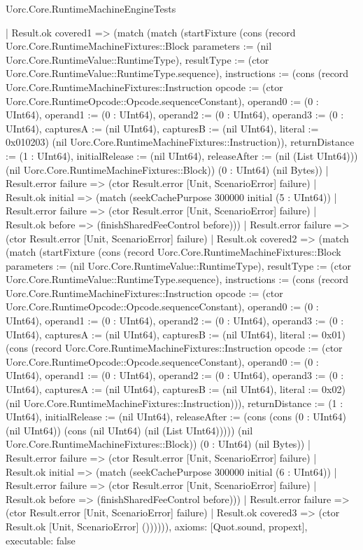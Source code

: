 \begin{lexlean}{Uorc.Core.RuntimeMachineEngineTests}
\begin{semanticmodule}
{      | Result.ok covered1 => (match (match (startFixture (cons (record Uorc.Core.RuntimeMachineFixtures::Block {parameters := (nil Uorc.Core.RuntimeValue::RuntimeType), resultType := (ctor Uorc.Core.RuntimeValue::RuntimeType.sequence), instructions := (cons (record Uorc.Core.RuntimeMachineFixtures::Instruction {opcode := (ctor Uorc.Core.RuntimeOpcode::Opcode.sequenceConstant), operand0 := (0 : UInt64), operand1 := (0 : UInt64), operand2 := (0 : UInt64), operand3 := (0 : UInt64), capturesA := (nil UInt64), capturesB := (nil UInt64), literal := 0x010203}) (nil Uorc.Core.RuntimeMachineFixtures::Instruction)), returnDistance := (1 : UInt64), initialRelease := (nil UInt64), releaseAfter := (nil (List UInt64))}) (nil Uorc.Core.RuntimeMachineFixtures::Block)) (0 : UInt64) (nil Bytes))
          | Result.error failure => (ctor Result.error [Unit, ScenarioError] failure)
          | Result.ok initial => (match (seekCachePurpose 300000 initial (5 : UInt64))
            | Result.error failure => (ctor Result.error [Unit, ScenarioError] failure)
            | Result.ok before => (finishSharedFeeControl before)))
        | Result.error failure => (ctor Result.error [Unit, ScenarioError] failure)
        | Result.ok covered2 => (match (match (startFixture (cons (record Uorc.Core.RuntimeMachineFixtures::Block {parameters := (nil Uorc.Core.RuntimeValue::RuntimeType), resultType := (ctor Uorc.Core.RuntimeValue::RuntimeType.sequence), instructions := (cons (record Uorc.Core.RuntimeMachineFixtures::Instruction {opcode := (ctor Uorc.Core.RuntimeOpcode::Opcode.sequenceConstant), operand0 := (0 : UInt64), operand1 := (0 : UInt64), operand2 := (0 : UInt64), operand3 := (0 : UInt64), capturesA := (nil UInt64), capturesB := (nil UInt64), literal := 0x01}) (cons (record Uorc.Core.RuntimeMachineFixtures::Instruction {opcode := (ctor Uorc.Core.RuntimeOpcode::Opcode.sequenceConstant), operand0 := (0 : UInt64), operand1 := (0 : UInt64), operand2 := (0 : UInt64), operand3 := (0 : UInt64), capturesA := (nil UInt64), capturesB := (nil UInt64), literal := 0x02}) (nil Uorc.Core.RuntimeMachineFixtures::Instruction))), returnDistance := (1 : UInt64), initialRelease := (nil UInt64), releaseAfter := (cons (cons (0 : UInt64) (nil UInt64)) (cons (nil UInt64) (nil (List UInt64))))}) (nil Uorc.Core.RuntimeMachineFixtures::Block)) (0 : UInt64) (nil Bytes))
            | Result.error failure => (ctor Result.error [Unit, ScenarioError] failure)
            | Result.ok initial => (match (seekCachePurpose 300000 initial (6 : UInt64))
              | Result.error failure => (ctor Result.error [Unit, ScenarioError] failure)
              | Result.ok before => (finishSharedFeeControl before)))
          | Result.error failure => (ctor Result.error [Unit, ScenarioError] failure)
          | Result.ok covered3 => (ctor Result.ok [Unit, ScenarioError] ()))))),
  axioms: [Quot.sound, propext],
  executable: false
}


\end{semanticmodule}
\end{lexlean}
